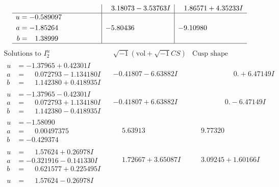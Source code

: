 \documentclass[1p]{elsarticle_modified}
\theoremstyle{definition}
\newcommand{\I}{\sqrt{-1}}
\begin{document}
$$\begin{array}{c|c|c}
 & \phantom{-}3.18073 - 3.53763 I & \phantom{-}1.86571 + 4.35233 I \\ \hline\begin{aligned}
u &= -0.589097\phantom{ +0.000000I} \\
a &= -1.85264\phantom{ +0.000000I} \\
b &= \phantom{-}1.38999\phantom{ +0.000000I}\end{aligned}
 & -5.80436\phantom{ +0.000000I} & -9.10980\phantom{ +0.000000I}\\
 \hline 
 \end{array}$$\newpage$$\begin{array}{c|c|c}  
\text{Solutions to }I^u_{2}& \I (\text{vol} + \sqrt{-1}CS) & \text{Cusp shape}\\
 \hline 
\begin{aligned}
u &= -1.37965 + 0.42301 I \\
a &= \phantom{-}0.072793 - 1.134180 I \\
b &= \phantom{-}1.142380 + 0.418935 I\end{aligned}
 & -0.41807 - 6.63882 I & \phantom{-0.000000 -}0. + 6.47149 I \\ \hline\begin{aligned}
u &= -1.37965 - 0.42301 I \\
a &= \phantom{-}0.072793 + 1.134180 I \\
b &= \phantom{-}1.142380 - 0.418935 I\end{aligned}
 & -0.41807 + 6.63882 I & \phantom{-0.000000 } 0. - 6.47149 I \\ \hline\begin{aligned}
u &= -1.58090\phantom{ +0.000000I} \\
a &= \phantom{-}0.00497375\phantom{ +0.000000I} \\
b &= -0.429374\phantom{ +0.000000I}\end{aligned}
 & \phantom{-}5.63913\phantom{ +0.000000I} & \phantom{-}9.77320\phantom{ +0.000000I} \\ \hline\begin{aligned}
u &= \phantom{-}1.57624 + 0.26978 I \\
a &= -0.321916 - 0.141330 I \\
b &= \phantom{-}0.621577 + 0.225495 I\end{aligned}
 & \phantom{-}1.72667 + 3.65087 I & \phantom{-}3.09245 + 1.60166 I \\ \hline\begin{aligned}
u &= \phantom{-}1.57624 - 0.26978 I \\

\end{aligned}
\end{array}$$
\end{document}
